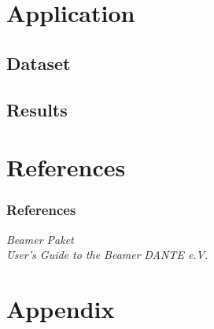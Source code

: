 \documentclass{beamer}
\theoremstyle{plain}
\theoremstyle{definition}
\begin{document}
\section{Application}

\subsection{Dataset}
\subsection{Results}


\section{References}
\begin{frame}

\frametitle{References}

\begin{thebibliography}{9}
 \emph{Beamer Paket} \\ 
 \emph{User's Guide to the Beamer} 
 \emph{DANTE e.V.}    
\end{thebibliography}


\end{frame}


\section{Appendix}
\end{document}
